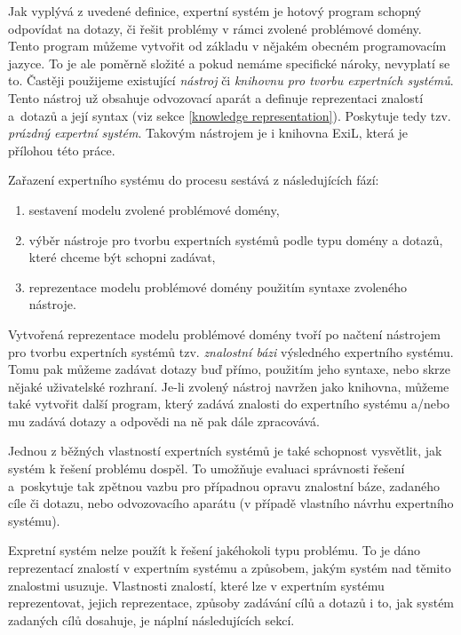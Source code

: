 Jak vyplývá z uvedené definice, expertní systém je hotový program schopný
odpovídat na dotazy, či řešit problémy v rámci zvolené problémové domény. Tento
program můžeme vytvořit od základu v nějakém obecném programovacím jazyce. To je
ale poměrně složité a pokud nemáme specifické nároky, nevyplatí se to.  Častěji
použijeme existující \emph{nástroj} či \emph{knihovnu pro tvorbu expertních
systémů}. Tento nástroj už obsahuje odvozovací aparát a definuje reprezentaci
znalostí a~dotazů a její syntax (viz sekce \ref{knowledge representation}).
Poskytuje tedy tzv. \emph{prázdný expertní systém}. Takovým nástrojem je i
knihovna ExiL, která je přílohou této práce.

Zařazení expertního systému do procesu sestává z následujících fází:
\begin{enumerate}
  \item sestavení modelu zvolené problémové domény,
  \item výběr nástroje pro tvorbu expertních systémů podle typu domény a dotazů,
    které chceme být schopni zadávat,
  \item reprezentace modelu problémové domény použitím syntaxe zvoleného
    nástroje.
\end{enumerate}
Vytvořená reprezentace modelu problémové domény tvoří po načtení nástrojem pro
tvorbu expertních systémů tzv. \emph{znalostní bázi} výsledného expertního systému.
Tomu pak můžeme zadávat dotazy buď přímo, použitím jeho syntaxe, nebo skrze
nějaké uživatelské rozhraní. Je-li zvolený nástroj navržen jako knihovna, můžeme
také vytvořit další program, který zadává znalosti do expertního systému a/nebo
mu zadává dotazy a odpovědi na ně pak dále zpracovává.

Jednou z běžných vlastností expertních systémů je také schopnost vysvětlit, jak
systém k řešení problému dospěl. To umožňuje evaluaci správnosti řešení
a~poskytuje tak zpětnou vazbu pro případnou opravu znalostní báze, zadaného cíle
či dotazu, nebo odvozovacího aparátu (v případě vlastního návrhu expertního
systému).

Expretní systém nelze použít k řešení jakéhokoli typu problému. To je dáno
reprezentací znalostí v expertním systému a způsobem, jakým systém nad těmito
znalostmi usuzuje. Vlastnosti znalostí, které lze v expertním systému
reprezentovat, jejich reprezentace, způsoby zadávání cílů a dotazů i to, jak
systém zadaných cílů dosahuje, je náplní následujících sekcí.
